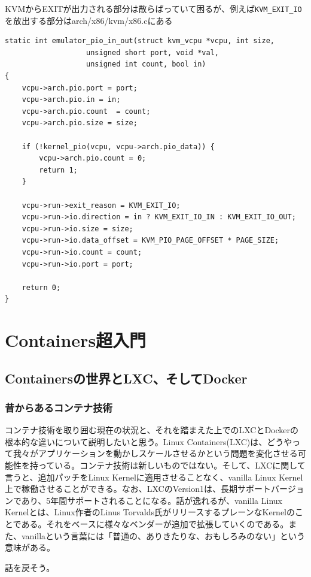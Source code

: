 ﻿\documentclass[9pt,b5paper,tombo,openany]{jsbook}
\begin{document}
KVMからEXITが出力される部分は散らばっていて困るが、例えば\verb|KVM_EXIT_IO|を放出する部分はarch/x86/kvm/x86.cにある

\begin{lstlisting}
static int emulator_pio_in_out(struct kvm_vcpu *vcpu, int size,
                   unsigned short port, void *val,
                   unsigned int count, bool in)
{
    vcpu->arch.pio.port = port;
    vcpu->arch.pio.in = in;
    vcpu->arch.pio.count  = count;
    vcpu->arch.pio.size = size;

    if (!kernel_pio(vcpu, vcpu->arch.pio_data)) {
        vcpu->arch.pio.count = 0;
        return 1;
    }

    vcpu->run->exit_reason = KVM_EXIT_IO;
    vcpu->run->io.direction = in ? KVM_EXIT_IO_IN : KVM_EXIT_IO_OUT;
    vcpu->run->io.size = size;
    vcpu->run->io.data_offset = KVM_PIO_PAGE_OFFSET * PAGE_SIZE;
    vcpu->run->io.count = count;
    vcpu->run->io.port = port;

    return 0;
}
\end{lstlisting}

\chapter{Containers超入門}

\section{Containersの世界とLXC、そしてDocker}

\subsection{昔からあるコンテナ技術}
コンテナ技術を取り囲む現在の状況と、それを踏まえた上でのLXCとDockerの根本的な違いについて説明したいと思う。Linux Containers(LXC)は、どうやって我々がアプリケーションを動かしスケールさせるかという問題を変化させる可能性を持っている。コンテナ技術は新しいものではない。そして、LXCに関して言うと、追加パッチをLinux Kernelに適用させることなく、vanilla Linux Kernel上で稼働させることができる。なお、LXCのVersion1は、長期サポートバージョンであり、5年間サポートされることになる。話が逸れるが、vanilla Linux Kernelとは、Linux作者のLinus Torvalds氏がリリースするプレーンなKernelのことである。それをベースに様々なベンダーが追加で拡張していくのである。また、vanillaという言葉には「普通の、ありきたりな、おもしろみのない」という意味がある。

\noindent
話を戻そう。
\end{document}
